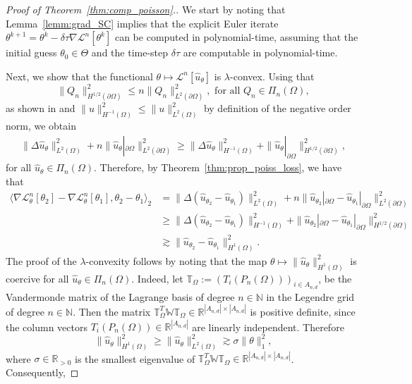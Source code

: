 \documentclass[pdflatex]{sn-jnl}%
\begin{document}
\vspace{-0em}\begin{proof}[Proof of Theorem~\ref{thm:comp_poisson}.]
We start by noting that Lemma~\ref{lemm:grad_SC} implies that the explicit Euler iterate 
$\theta^{k+1} = \theta^k-\delta \tau \nabla\mathcal{L}^n[\theta^{k}]$ 
can be computed in polynomial-time, assuming that the initial guess $\theta_0\in \Theta$ and the time-step $\delta\tau$ are computable in polynomial-time. 

Next, we show that the functional $\theta \mapsto \mathcal{L}^n[\hat{u}_\theta]$ is $\lambda$-convex. Using that 
$$
\|Q_n\|_{H^{1/2}(\partial\Omega)}^2\leq n\|Q_n\|_{L^2(\partial\Omega)}^2,\textrm{ for all } Q_n\in \Pi_{n}(\Omega),
$$
as shown in \cite{Diethelm2002-kr} and $\|u\|_{H^{-1}(\Omega)}^2\leq \|u\|_{L^2(\Omega)}^2$ by definition of the negative order norm, we obtain 
\begin{align*}
\|\Delta \hat{u}_\theta\|_{L^2(\Omega)}^2 +n \| \hat{u}_\theta|_{\partial\Omega}\|_{L^2(\partial\Omega)}^2\geq \|\Delta  \hat{u}_\theta\|_{H^{-1}(\Omega)}^2 +\| \hat{u}_\theta|_{\partial\Omega}\|_{H^{1/2}(\partial\Omega)}^2,
\end{align*}
for all $\hat{u}_\theta\in \Pi_n(\Omega)$. Therefore, by Theorem~\ref{thm:prop_poiss_loss}, we have that 
\begin{equation}
\begin{aligned}
        \langle\nabla\mathcal{L}^n_\theta[\theta_2]-\nabla\mathcal{L}^n_\theta[\theta_1],\theta_2-\theta_1 \rangle_{2} &= \|\Delta (\hat{u}_{\theta_2}-\hat{u}_{\theta_1})\|_{L^2(\Omega)}^2 +n \|\hat{u}_{\theta_2}|_{\partial\Omega}-\hat{u}_{\theta_1}|_{\partial\Omega}\|_{L^2(\partial\Omega)}^2\\&\geq \|\Delta (\hat{u}_{\theta_2}-\hat{u}_{\theta_1})\|_{H^{-1}(\Omega)}^2 +\|\hat{u}_{\theta_2}|_{\partial\Omega}-\hat{u}_{\theta_1}|_{\partial\Omega}\|_{H^{1/2}(\partial\Omega)}^2\\&
        \gtrsim \|\hat{u}_{\theta_2}-\hat{u}_{\theta_1}\|_{H^1(\Omega)}^2.
    \end{aligned}
\end{equation}
The proof of the $\lambda$-convexity follows by noting that the map $\theta\mapsto \|\hat{u}_
\theta\|_{H^1(\Omega)}^2$ is coercive for all $\hat{u}_\theta\in \Pi_{n}(\Omega)$. Indeed, let $\mathbb{T}_\Omega:=\left(T_i(P_n(\Omega))\right)_{i\in A_{n,d}}$, be the Vandermonde matrix of the Lagrange basis of degree $n\in \mathbb{N}$ in the Legendre grid of degree $n\in \mathbb{N}$. Then the matrix $\mathbb{T}_\Omega^T\mathbb{W}\mathbb{T}_\Omega\in \mathbb{R}^{|A_{n,d}|\times |A_{n,d}|}$ is positive definite, since the column vectors $T_i(P_{n}(\Omega))\in \mathbb{R}^{|A_{n,d}|}$ are linearly independent. Therefore 
\begin{equation}
     \|\hat{u}_
\theta\|_{H^1(\Omega)}^2\geq  \|\hat{u}_
\theta\|_{L^2(\Omega)}^2 \gtrsim \sigma\|\theta\|_1^2,
\end{equation}
where $\sigma\in \mathbb{R}_{>0}$ is the smallest eigenvalue of $\mathbb{T}_\Omega^T\mathbb{W}\mathbb{T}_\Omega\in \mathbb{R}^{|A_{n,d}|\times |A_{n,d}|}$. Consequently,


\end{proof}
\end{document}
